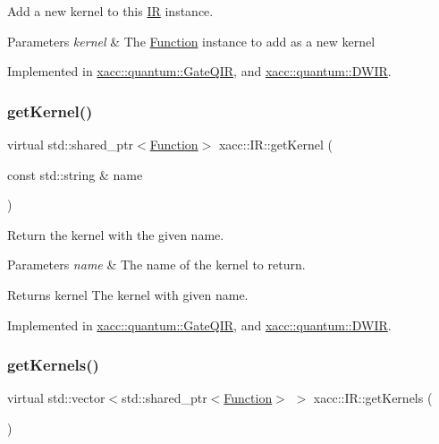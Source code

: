Add a new kernel to this \hyperlink{a01677}{IR} instance.


\begin{DoxyParams}{Parameters}
{\em kernel} & The \hyperlink{a01653}{Function} instance to add as a new kernel \\
\hline
\end{DoxyParams}


Implemented in \hyperlink{a01265_aa6ed2cf2cbcfec8105c327a4fa95346f}{xacc\+::quantum\+::\+Gate\+Q\+IR}, and \hyperlink{a01217_af1bef18e1e9568d1313b03149aab8c1b}{xacc\+::quantum\+::\+D\+W\+IR}.

\mbox{\label{a01677_a6f49b4ba4b3a15142b04873284885f0d}} 
\subsubsection{\texorpdfstring{get\+Kernel()}{getKernel()}}
{\footnotesize\ttfamily virtual std\+::shared\+\_\+ptr$<$\hyperlink{a01653}{Function}$>$ xacc\+::\+I\+R\+::get\+Kernel (\begin{DoxyParamCaption}\item[{const std\+::string \&}]{name }\end{DoxyParamCaption})\hspace{0.3cm}{\ttfamily [pure virtual]}}

Return the kernel with the given name.


\begin{DoxyParams}{Parameters}
{\em name} & The name of the kernel to return. \\
\hline
\end{DoxyParams}
\begin{DoxyReturn}{Returns}
kernel The kernel with given name. 
\end{DoxyReturn}


Implemented in \hyperlink{a01265_a194758b6edcc3ae0c7fe8004f9bfe690}{xacc\+::quantum\+::\+Gate\+Q\+IR}, and \hyperlink{a01217_a38d8bdd24250749bc38ad31f8512fcfc}{xacc\+::quantum\+::\+D\+W\+IR}.

\mbox{\label{a01677_a88c50bfc5b279145360ddc0c3a703b9b}} 
\subsubsection{\texorpdfstring{get\+Kernels()}{getKernels()}}
{\footnotesize\ttfamily virtual std\+::vector$<$std\+::shared\+\_\+ptr$<$\hyperlink{a01653}{Function}$>$ $>$ xacc\+::\+I\+R\+::get\+Kernels (\begin{DoxyParamCaption}{ }\end{DoxyParamCaption})\hspace{0.3cm}{\ttfamily [pure virtual]}}

